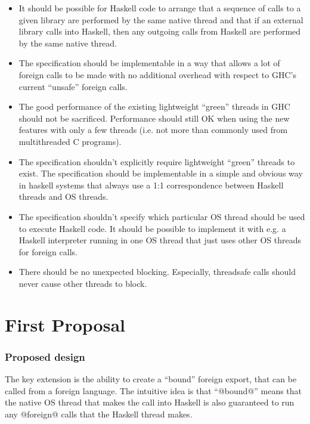 \documentclass{article}
\begin{document}
\begin{itemize}
\item It should be possible for Haskell code to arrange that a sequence of
calls to a given library are performed by the same native thread and
that if an external library calls into Haskell, then any outgoing calls
from Haskell are performed by the same native thread.

\item The specification should be implementable in a way that allows a lot
of foreign calls to be made with no additional overhead with respect to
GHC's current ``unsafe'' foreign calls.

\item The good performance of the existing lightweight ``green'' threads in
GHC should not be sacrificed. Performance should still OK when using
the new features with only a few threads (i.e. not more than commonly
used from multithreaded C programs).

\item The specification shouldn't explicitly require lightweight ``green''
threads to exist. The specification should be implementable in a simple
and obvious way in haskell systems that always use a 1:1 correspondence
between Haskell threads and OS threads.

\item The specification shouldn't specify which particular OS thread
should be used to execute Haskell code. It should be possible to
implement it with e.g. a Haskell interpreter running in one OS thread
that just uses other OS threads for foreign calls.

\item There should be no unexpected blocking. Especially, threadsafe calls
should never cause other threads to block.
\end{itemize}

\part{First Proposal}
\section{Proposed design}

The key extension is the ability to create a ``bound'' foreign export,
that can be called from a foreign language.
The intuitive idea is that ``@bound@'' means that the native OS thread that makes
the call into Haskell is also guaranteed to run any @foreign@ calls that the
Haskell thread makes.  
\end{document}
